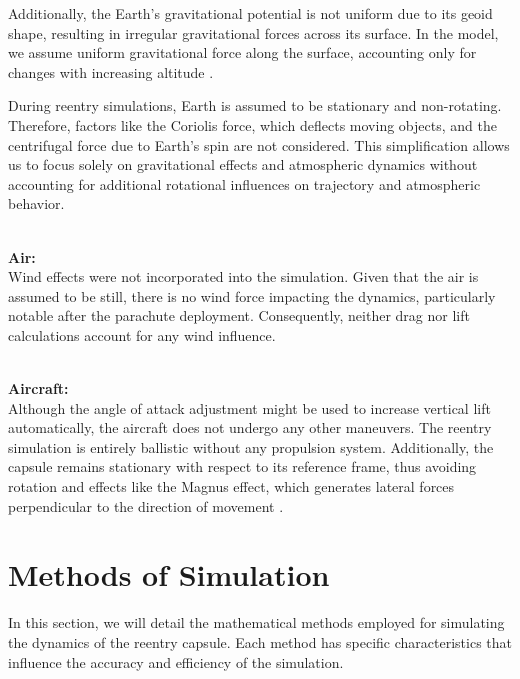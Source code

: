 \documentclass[runningheads]{llncs}
\begin{document}
Additionally, the Earth's gravitational potential is not uniform due to its geoid shape, resulting in irregular gravitational forces across its surface. In the model, we assume uniform gravitational force along the surface, accounting only for changes with increasing altitude \cite{mazyku_optimum_reentry}.

During reentry simulations, Earth is assumed to be stationary and non-rotating. Therefore, factors like the Coriolis force, which deflects moving objects, and the centrifugal force due to Earth's spin are not considered. This simplification allows us to focus solely on gravitational effects and atmospheric dynamics without accounting for additional rotational influences on trajectory and atmospheric behavior.


\textbf{\\Air:\\}
Wind effects were not incorporated into the simulation. Given that the air is assumed to be still, there is no wind force impacting the dynamics, particularly notable after the parachute deployment. Consequently, neither drag nor lift calculations account for any wind influence.

\textbf{\\Aircraft:\\}
Although the angle of attack adjustment might be used to increase vertical lift automatically, the aircraft does not undergo any other maneuvers. The reentry simulation is entirely ballistic without any propulsion system. Additionally, the capsule remains stationary with respect to its reference frame, thus avoiding rotation and effects like the Magnus effect, which generates lateral forces perpendicular to the direction of movement \cite{returning_space}.









\section{Methods of Simulation}
In this section, we will detail the mathematical methods employed for simulating the dynamics of the reentry capsule. Each method has specific characteristics that influence the accuracy and efficiency of the simulation.
\end{document}
